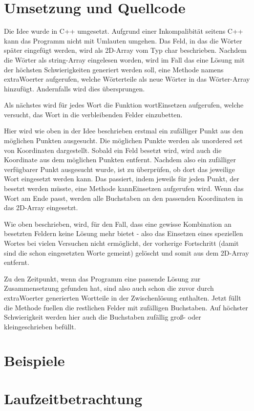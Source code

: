 \documentclass[a4paper,10pt,ngerman]{scrartcl}
\begin{document}
\section{Umsetzung und Quellcode}
Die Idee wurde in C++ umgesetzt. Aufgrund einer Inkompalibität seitens C++ kann das Programm nicht mit
Umlauten umgehen.
Das Feld, in das die Wörter später eingefügt werden, wird als 2D-Array vom Typ char beschrieben.
Nachdem die Wörter als string-Array eingelesen worden, wird im Fall das eine Lösung mit der höchsten Schwierigkeiten generiert werden soll, eine Methode namens extraWoerter aufgerufen, welche Wörterteile als neue Wörter in das Wörter-Array hinzufügt. Andernfalls wird dies übersprungen.

Als nächstes wird für jedes Wort die Funktion wortEinsetzen aufgerufen, welche versucht, das Wort in die verbleibenden Felder einzubetten.

Hier wird wie oben in der Idee beschrieben erstmal ein zufälliger Punkt aus den möglichen Punkten ausgesucht.
Die möglichen Punkte werden als unordered set von Koordinaten dargestellt. Sobald ein Feld besetzt wird, wird auch die Koordinate aus dem möglichen Punkten entfernt.
Nachdem also ein zufälliger verfügbarer Punkt ausgesucht wurde, ist zu überprüfen, ob dort das jeweilige Wort eingesetzt werden kann. Das passiert, indem jeweils für jeden Punkt, der besetzt werden müsste, eine Methode kannEinsetzen aufgerufen wird. Wenn das Wort am Ende passt, werden alle Buchstaben an den passenden Koordinaten
in das 2D-Array eingesetzt.

Wie oben beschrieben, wird, für den Fall, dass eine gewisse Kombination an besetzten Feldern keine Lösung mehr bietet - also das Einsetzen eines speziellen Wortes bei vielen Versuchen nicht ermöglicht, der vorherige Fortschritt (damit sind die schon eingesetzten Worte gemeint) gelöscht und somit aus dem 2D-Array entfernt.

Zu den Zeitpunkt, wenn das Programm eine passende Lösung zur Zusammensetzung gefunden hat, sind also auch schon die zuvor durch extraWoerter generierten Wortteile in der Zwischenlösung enthalten.
Jetzt füllt die Methode fuellen die restlichen Felder mit zufälligen Buchstaben. 
Auf höchster Schwierigkeit werden hier auch die Buchstaben zufällig groß- oder kleingeschrieben befüllt.

\section{Beispiele}

\section{Laufzeitbetrachtung}
\end{document}
